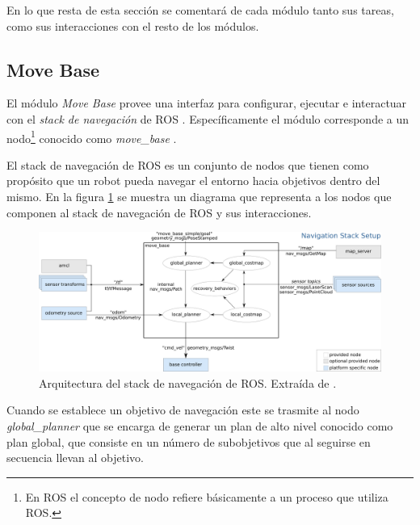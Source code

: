 En lo que resta de esta sección se comentará de cada módulo tanto sus tareas,
como sus interacciones con el resto de los módulos.

\subsection{Move Base}\label{subsec:move_base}
El módulo \emph{Move Base} provee una interfaz para configurar, ejecutar e
interactuar con el \emph{stack de navegación} de \gls{ROS}
\cite{ROS-navigation}. Específicamente el módulo corresponde a un
nodo\footnote{En \gls{ROS} el concepto de nodo refiere básicamente a un proceso que
  utiliza ROS.} conocido como \emph{move\_base}
  \cite{ROS-move_base}. 

El stack de navegación de \gls{ROS} es un conjunto de nodos que tienen como propósito
que un robot pueda navegar el entorno hacia objetivos dentro del mismo. En la
figura \ref{fig:move_base} se muestra un diagrama que representa a los nodos que
componen al stack de navegación de \gls{ROS} y sus interacciones.

\begin{figure}[H]
  \center
  \includegraphics[width=1\linewidth]{imagenes/move_base.png}
  \caption[Arquitectura del stack de navegación de ROS.]{Arquitectura del stack de navegación de \gls{ROS}. Extraída de \cite{ROS-move_base}.}
  \label{fig:move_base}
\end{figure} 

Cuando se establece un objetivo de navegación este se trasmite al nodo
\emph{global\_planner} que se encarga de generar un plan de alto nivel
conocido como plan global, que consiste en un número de subobjetivos que al 
seguirse en secuencia llevan al objetivo.


